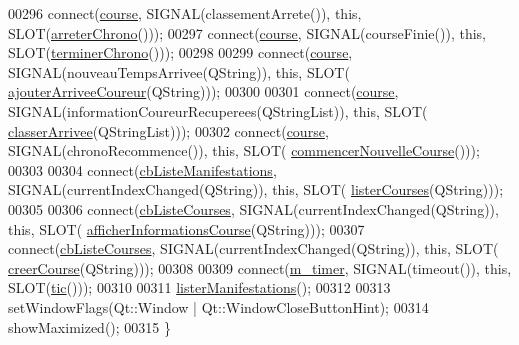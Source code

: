 \begin{DoxyCode}
00296     connect(\hyperlink{class_i_h_m_chrono_cross_a03a8226c0e7f423d29302d9a06284ab4}{course}, SIGNAL(classementArrete()), \textcolor{keyword}{this}, SLOT(\hyperlink{class_i_h_m_chrono_cross_a8d5c89a4d2ca34252acd8737e29d37fe}{arreterChrono}()));
00297     connect(\hyperlink{class_i_h_m_chrono_cross_a03a8226c0e7f423d29302d9a06284ab4}{course}, SIGNAL(courseFinie()), \textcolor{keyword}{this}, SLOT(\hyperlink{class_i_h_m_chrono_cross_a32ee157ca6bd8c3e94b57f3cecdeee4e}{terminerChrono}()));
00298 
00299     connect(\hyperlink{class_i_h_m_chrono_cross_a03a8226c0e7f423d29302d9a06284ab4}{course}, SIGNAL(nouveauTempsArrivee(QString)), \textcolor{keyword}{this}, SLOT(
      \hyperlink{class_i_h_m_chrono_cross_a2ce63851d1f2723057ac649b7e320cfe}{ajouterArriveeCoureur}(QString)));
00300 
00301     connect(\hyperlink{class_i_h_m_chrono_cross_a03a8226c0e7f423d29302d9a06284ab4}{course}, SIGNAL(informationCoureurRecuperees(QStringList)), \textcolor{keyword}{this}, SLOT(
      \hyperlink{class_i_h_m_chrono_cross_a5e9b561659ba63d2739335b8ab432cbf}{classerArrivee}(QStringList)));
00302     connect(\hyperlink{class_i_h_m_chrono_cross_a03a8226c0e7f423d29302d9a06284ab4}{course}, SIGNAL(chronoRecommence()), \textcolor{keyword}{this}, SLOT(
      \hyperlink{class_i_h_m_chrono_cross_ab899a1d60c1f853b199abb937ae08e74}{commencerNouvelleCourse}()));
00303 
00304     connect(\hyperlink{class_i_h_m_chrono_cross_a4b7a6af527d8d2d28d8ea6ea7cbfac75}{cbListeManifestations}, SIGNAL(currentIndexChanged(QString)), \textcolor{keyword}{this}, SLOT(
      \hyperlink{class_i_h_m_chrono_cross_a1b9f117d7097b63ddabe168a5349a7e8}{listerCourses}(QString)));
00305 
00306     connect(\hyperlink{class_i_h_m_chrono_cross_af47891e3e9f2bb2c955be8c128e830b5}{cbListeCourses}, SIGNAL(currentIndexChanged(QString)), \textcolor{keyword}{this}, SLOT(
      \hyperlink{class_i_h_m_chrono_cross_afe18e84e4df15c15921f2bdcfc6f4396}{afficherInformationsCourse}(QString)));
00307     connect(\hyperlink{class_i_h_m_chrono_cross_af47891e3e9f2bb2c955be8c128e830b5}{cbListeCourses}, SIGNAL(currentIndexChanged(QString)), \textcolor{keyword}{this}, SLOT(
      \hyperlink{class_i_h_m_chrono_cross_a3fc01e539c59645e0655e56e440f4b83}{creerCourse}(QString)));
00308 
00309     connect(\hyperlink{class_i_h_m_chrono_cross_ad29ebde513a6e722cf87aa06e767416a}{m\_timer}, SIGNAL(timeout()), \textcolor{keyword}{this}, SLOT(\hyperlink{class_i_h_m_chrono_cross_a9706094a679e33f3595e28776596a91b}{tic}()));
00310 
00311     \hyperlink{class_i_h_m_chrono_cross_adb47e6ee9c2a917a6df77b64930c3c48}{listerManifestations}();
00312 
00313     setWindowFlags(Qt::Window | Qt::WindowCloseButtonHint);
00314     showMaximized();
00315 \}
\end{DoxyCode}
\mbox{\label{class_i_h_m_chrono_cross_a312f21e1d150096b3f36ba36476907eb}} 
